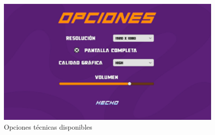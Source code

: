 \begin{figure}[h]
    \centering
    \includegraphics[scale=0.45]{img/OptionsScreen.jpg}
    \caption{Opciones técnicas disponibles}
    \label{fig:Opciones}
    \end{figure}
    
